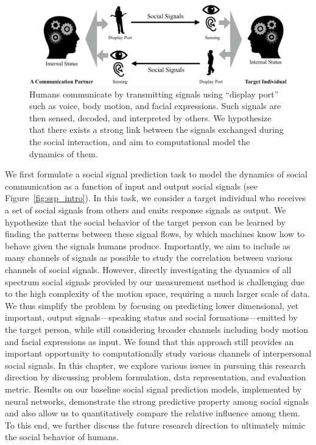 \begin{figure}[t]
	\includegraphics[width=\linewidth]{ssp_fig/socialcomm}
	\caption{Humans communicate by transmitting signals using ``display port'' such as voice, body motion, and facial expressions. Such signals are then sensed, decoded, and interpreted by others. We hypothesize that there exists a strong link between the signals exchanged during the social interaction, and aim to computational model the dynamics of them.}
	\label{fig:ssp_intro_flow}
\end{figure}

We first formulate a social signal prediction task to model the dynamics of social communication as a function of input and output social signals (see Figure~\ref{fig:ssp_intro}). In this task, we consider a target individual who receives a set of social signals from others and emits response signals as output. We hypothesize that the social behavior of the target person can be learned by finding the patterns between these signal flows, by which machines know how to behave given the signals humans produce. Importantly, we aim to include as many channels of signals as possible to study the correlation between various channels of social signals. However, directly investigating the dynamics of all spectrum social signals provided by our measurement method is challenging due to the high complexity of the motion space, requiring a much larger scale of data. We thus simplify the problem by focusing on predicting lower dimensional, yet important, output signals---speaking status and social formations---emitted by the target person, while still considering broader channels including body motion and facial expressions as input. We found that this approach still provides an important opportunity to computationally study various channels of interpersonal social signals. In this chapter, we explore various issues in pursuing this research direction by discussing problem formulation, data representation, and evaluation metric. Results on our baseline social signal prediction models, implemented by neural networks, demonstrate the strong predictive property among social signals and also allow us to quantitatively compare the relative influence among them. To this end, we further discuss the future research direction to ultimately mimic the social behavior of humans.



